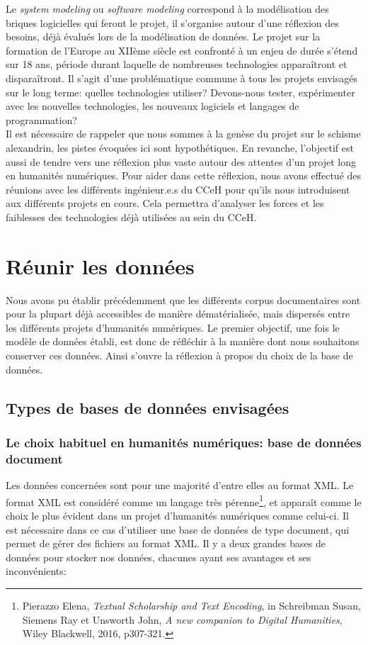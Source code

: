 Le \textit{system modeling} ou \textit{software modeling} correspond à la modélisation des briques logicielles qui feront le projet, il s’organise autour d’une réflexion des besoins, déjà évalués lors de la modélisation de données. 
Le projet sur la formation de l’Europe au XIIème siècle est confronté à un enjeu de durée s'étend sur 18 ans, période durant laquelle de nombreuses technologies apparaîtront et disparaîtront. Il s’agit d’une problématique commune à tous les projets envisagés sur le  long terme: quelles technologies utiliser?  Devons-nous tester, expérimenter avec les nouvelles technologies, les nouveaux logiciels et langages de programmation? \\
Il est nécessaire de rappeler que nous sommes à la genèse du projet sur le schisme alexandrin, les pistes évoquées ici sont hypothétiques. En revanche, l’objectif est aussi de tendre vers une réflexion plus vaste autour des attentes d’un projet long en humanités numériques. Pour aider dans cette réflexion, nous avons effectué des réunions avec les différents ingénieur.e.s du CCeH pour qu’ils nous introduisent aux différents projets en cours. Cela permettra d’analyser les forces et les faiblesses des technologies déjà utilisées au sein du CCeH.


    
    \chapter{Réunir les données}

Nous avons pu établir précédemment que les différents corpus documentaires sont pour la plupart déjà accessibles de manière dématérialisée, mais dispersés entre les différents projets d’humanités numériques. Le premier objectif, une fois le modèle de données établi, est donc de réfléchir à la manière dont nous souhaitons conserver ces données. Ainsi s’ouvre la réflexion à propos du choix de la base de données. 

    \section{Types de bases de données envisagées}

    \subsection{Le choix habituel en humanités numériques: base de données document}

Les données concernées sont pour une majorité d’entre elles au format XML. Le format XML est considéré comme un langage très pérenne\footnote{Pierazzo Elena, \textit{Textual Scholarship and Text Encoding}, in Schreibman Susan, Siemens Ray et Unsworth John, \textit{A new companion to Digital Humanities}, Wiley Blackwell, 2016, p307-321.}, et apparaît comme le choix le plus évident dans un projet d’humanités numériques comme celui-ci. Il est nécessaire dans ce cas d’utiliser une base de données de type document, qui permet de gérer des fichiers au format XML. Il y a deux grandes bases de données pour stocker nos données, chacunes ayant ses avantages et ses inconvénients:\\

